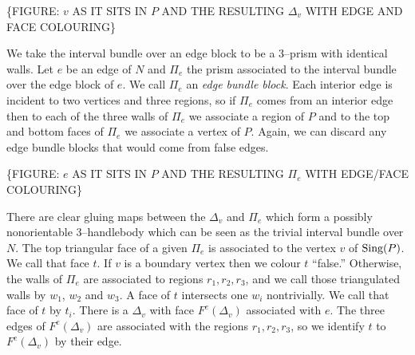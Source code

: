 \{FIGURE: $v$ AS IT SITS IN $P$ AND THE RESULTING $\Delta_v$ WITH EDGE AND FACE COLOURING\}

We take the interval bundle over an edge block to be a 3--prism with identical walls.
Let $e$ be an edge of $N$ and $\Pi_e$ the prism associated to the interval bundle over the edge block of $e$.
We call $\Pi_e$ an \emph{edge bundle block}.
Each interior edge is incident to two vertices and three regions, so if $\Pi_e$ comes from an interior edge then to each of the three walls of $\Pi_e$ we associate a region of $P$ and to the top and bottom faces of $\Pi_e$ we associate a vertex of $P$.
Again, we can discard any edge bundle blocks that would come from false edges.

\{FIGURE: $e$ AS IT SITS IN $P$ AND THE RESULTING $\Pi_e$ WITH EDGE/FACE COLOURING\}

There are clear gluing maps between the $\Delta_v$ and $\Pi_e$ which form a possibly nonorientable 3--handlebody which can be seen as the trivial interval bundle over $N$.
The top triangular face of a given $\Pi_e$ is associated to the vertex $v$ of $\textrm{Sing} (P)$.
We call that face $t$.
If $v$ is a boundary vertex then we colour $t$ ``false.''
Otherwise, the walls of $\Pi_e$ are associated to regions $r_1,r_2,r_3$, and we call those triangulated walls by $w_1$, $w_2$ and $w_3$.
A face of $t$ intersects one $w_i$ nontrivially.
We call that face of $t$ by $t_i$.
There is a $\Delta_v$ with face $F^e(\Delta_v)$ associated with $e$.
The three edges of $F^e(\Delta_v)$ are associated with the regions $r_1,r_2,r_3$, so we identify $t$ to $F^e(\Delta_v)$ by their edge.


